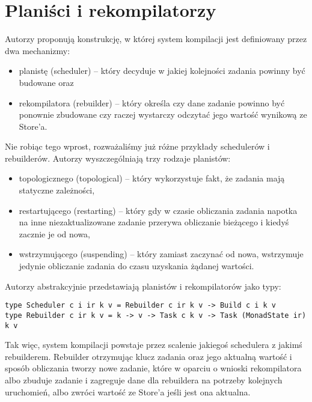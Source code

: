 \section{Planiści i rekompilatorzy}

Autorzy proponują konstrukcję, w której system kompilacji jest definiowany przez dwa mechanizmy:
\begin{itemize}
\item planistę (scheduler) -- który decyduje w jakiej kolejności zadania powinny być budowane oraz
\item rekompilatora (rebuilder) -- który określa czy dane zadanie powinno być ponownie zbudowane czy raczej wystarczy odczytać jego wartość wynikową ze Store'a.
\end{itemize}

Nie robiąc tego wprost, rozważaliśmy już różne przykłady schedulerów i rebuilderów. Autorzy wyszczególniają trzy rodzaje planistów:

\begin{itemize}
\item topologicznego (topological) -- który wykorzystuje fakt, że zadania mają statyczne zależności,
\item restartującego (restarting) -- który gdy w czasie obliczania zadania napotka na inne niezaktualizowane zadanie przerywa obliczanie bieżącego i kiedyś zacznie je od nowa,
\item wstrzymującego (suspending) -- który zamiast zaczynać od nowa, wstrzymuje jedynie obliczanie zadania do czasu uzyskania żądanej wartości.
\end{itemize}

Autorzy abstrakcyjnie przedstawiają planistów i rekompilatorów jako typy:

\begin{lstlisting}
type Scheduler c i ir k v = Rebuilder c ir k v -> Build c i k v
type Rebuilder c ir k v = k -> v -> Task c k v -> Task (MonadState ir) k v
\end{lstlisting}


Tak więc, system kompilacji powstaje przez scalenie jakiegoś schedulera z jakimś rebuilderem. Rebuilder otrzymując klucz zadania oraz jego aktualną wartość i sposób obliczania tworzy nowe zadanie, które w oparciu o wnioski rekompilatora albo zbuduje zadanie i zagreguje dane dla rebuildera na potrzeby kolejnych uruchomień, albo zwróci wartość ze Store'a jeśli jest ona aktualna.

